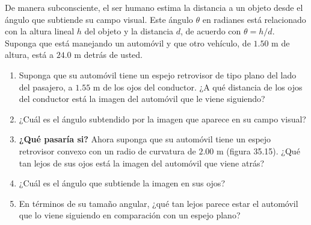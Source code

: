 \item De manera subconsciente, el ser humano estima la distancia a un objeto desde el ángulo que subtiende su campo visual. Este ángulo $\theta$ en radianes está relacionado con la altura lineal $h$ del objeto y la distancia $d$, de acuerdo con $\theta = h/d$. Suponga que está manejando un automóvil y que otro vehículo, de $1.50\text{ m}$ de altura, está a $24.0\text{ m}$ detrás de usted.
\begin{enumerate}
    \item Suponga que su automóvil tiene un espejo retrovisor de tipo plano del lado del pasajero, a $1.55\text{ m}$ de los ojos del conductor. ¿A qué distancia de los ojos del conductor está la imagen del automóvil que le viene siguiendo?
    \item ¿Cuál es el ángulo subtendido por la imagen que aparece en su campo visual?
    \item \textbf{¿Qué pasaría si?} Ahora suponga que su automóvil tiene un espejo retrovisor convexo con un radio de curvatura de $2.00\text{ m}$ (figura 35.15). ¿Qué tan lejos de sus ojos está la imagen del automóvil que viene atrás?
    \item ¿Cuál es el ángulo que subtiende la imagen en sus ojos?
    \item En términos de su tamaño angular, ¿qué tan lejos parece estar el automóvil que lo viene siguiendo en comparación con un espejo plano?
\end{enumerate}